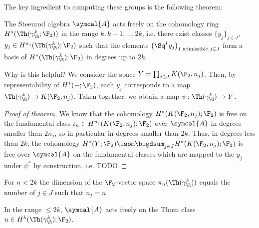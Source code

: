 The key ingredient to computing these groups is the following theorem:
\begin{theorem}
	The Steenrod algebra $\symcal{A}$ acts freely on the cohomology ring $H^*(\Th(\gamma_\R^k; \F_2))$ in the range $k, k + 1, \ldots, 2k$, i.e. there exist classes $\{y_j\}_{j \in J}$, $y_j \in H^{n_j}(\Th(\gamma_\R^k); \F_2)$ such that the elements $\big(\Sq^I y_j\big)_{I \text{ admissible}, j \in J}$ form a basis of $H^*(\Th(\gamma_\R^k); \F_2)$ in degrees up to $2k$.
\end{theorem}
\begin{remark}
	Why is this helpful?
	We consider the space $Y = \prod_{j \in J} K(\F_2, n_j)$.
	Then, by representability of $H^*({{-}}; \F_2)$, each $y_j$ corresponds to a map $\Th(\gamma_\R^k) \to K(\F_2, n_j)$.
	Taken together, we obtain a map $\psi\colon \Th(\gamma_\R^k) \to Y$.
\end{remark}
\begin{proof}[Proof of theorem]
	We know that the cohomology $H^*(K(\F_2, n_j); \F_2)$ is free on the fundamental class $\iota_n \in H^{n_j}(K(\F_2, n_j); \F_2)$ over $\symcal{A}$ in degrees smaller than $2n_j$, so in particular in degrees smaller than $2k$.
	Thus, in degrees less than $2k$, the cohomology $H^*(Y; \F_2) \isom \bigdsum_{j \in J} H^*(K(\F_2, n_j); \F_2)$ is free over $\symcal{A}$ on the fundamental classes which are mapped to the $y_j$ under $\psi^*$ by construction, i.e. TODO
\end{proof}
\begin{corollary}
	For $n < 2k$ the dimension of the $\F_2$-vector space $\pi_n(\Th(\gamma_\R^k))$ equals the number of $j \in J$ such that $n_j = n$.
\end{corollary}
\begin{lemma}
	In the range $\leq 2k$, $\symcal{A}$ acts freely on the Thom class $u \in H^k(\Th(\gamma_\R^k); \F_2)$.
\end{lemma}
